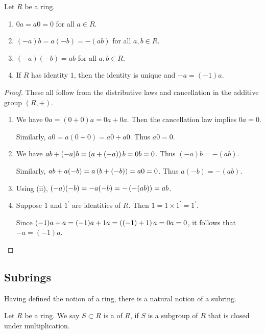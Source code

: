 \begin{lemma}
Let $R$ be a ring.
\begin{enumerate}[label=(\roman*)]
\item $0a=a0=0$ for all $a\in R$.
\item $(-a)b=a(-b)=-(ab)$ for all $a,b\in R$.
\item $(-a)(-b)=ab$ for all $a,b\in R$.
\item If $R$ has identity $1$, then the identity is unique and $-a=(-1)a$.
\end{enumerate}
\end{lemma}

\begin{proof}
These all follow from the distributive laws and cancellation in the additive group $(R,+)$.
\begin{enumerate}[label=(\roman*)]
\item We have $0a=(0+0)a=0a+0a$. Then the cancellation law implies $0a=0$. 

Similarly, $a0=a(0+0)=a0+a0$. Thus $a0=0$.

\item We have $ab+(-a)b=\left(a+(-a)\right)b=0b=0$. Thus $(-a)b=-(ab)$. 

Similarly, $ab+a(-b)=a\left(b+(-b)\right)=a0=0$. Thus $a(-b)=-(ab)$.

\item Using (ii), $(-a)(-b)=-a(-b)=-\left(-(ab)\right)=ab$.

\item Suppose $1$ and $1^\prime$ are identities of $R$. Then $1=1\times1^\prime=1^\prime$.

Since $(-1)a+a=(-1)a+1a=\left((-1)+1\right)a=0a=0$, it follows that $-a=(-1)a$.
\end{enumerate}
\end{proof}

\subsection{Subrings}
Having defined the notion of a ring, there is a natural notion of a subring.

\begin{definition}[Subring]
Let $R$ be a ring. We say $S\subset R$ is a  of $R$, if $S$ is a subgroup of $R$ that is closed under multiplication.
\end{definition}

